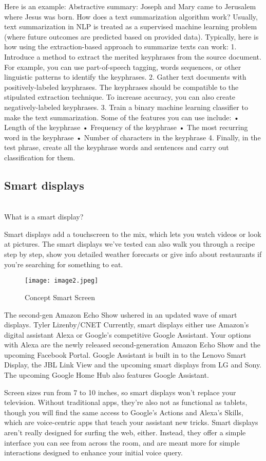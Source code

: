 \documentclass[12pt,a4paper]{article}
\begin{document}
Here is an example:
Abstractive summary: Joseph and Mary came to Jerusalem where Jesus was born.
How does a text summarization algorithm work?
Usually, text summarization in NLP is treated as a supervised machine learning problem (where future outcomes are predicted based on provided data).
Typically, here is how using the extraction-based approach to summarize texts can work:
1. Introduce a method to extract the merited keyphrases from the source document. For example, you can use part-of-speech tagging, words sequences, or other linguistic patterns to identify the keyphrases.
2. Gather text documents with positively-labeled keyphrases. The keyphrases should be compatible to the stipulated extraction technique. To increase accuracy, you can also create negatively-labeled keyphrases.
3. Train a binary machine learning classifier to make the text summarization. Some of the features you can use include:
•	Length of the keyphrase
•	Frequency of the keyphrase
•	The most recurring word in the keyphrase
•	Number of characters in the keyphrase
4. Finally, in the test phrase, create all the keyphrase words and sentences and carry out classification for them.


\newpage
\begin{center}
\section{Smart displays}
\end{center}
\\ What is a smart display?
\par Smart displays add a touchscreen to the mix, which lets you watch videos or look at pictures. The smart displays we've tested can also walk you through a recipe step by step, show you detailed weather forecasts or give info about restaurants if you're searching for something to eat.
 
\begin{figure}[h]
	\centering
	\texttt{[image: image2.jpeg]}
	\caption{Concept Smart Screen}
\end{figure} 
 
\par The second-gen Amazon Echo Show ushered in an updated wave of smart displays.
Tyler Lizenby/CNET
Currently, smart displays either use Amazon's digital assistant Alexa or Google's competitive Google Assistant. Your options with Alexa are the newly released second-generation Amazon Echo Show and the upcoming Facebook Portal. Google Assistant is built in to the Lenovo Smart Display, the JBL Link View and the upcoming smart displays from LG and Sony. The upcoming Google Home Hub also features Google Assistant.
\par Screen sizes run from 7 to 10 inches, so smart displays won't replace your television. Without traditional apps, they're also not as functional as tablets, though you will find the same access to Google's Actions and Alexa's Skills, which are voice-centric apps that teach your assistant new tricks.
Smart displays aren't really designed for surfing the web, either. Instead, they offer a simple interface you can see from across the room, and are meant more for simple interactions designed to enhance your initial voice query. 
\end{document}
